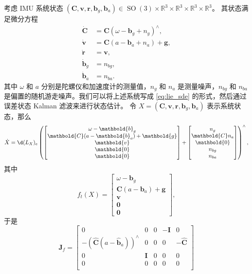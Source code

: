 \documentclass[fontset=none,zihao=-4]{Notes}
\DeclareMathOperator\SO{SO}
\newcommand{\mat}[1]{\mathbold{#1}}
\begin{document}
\begin{example}[IMU 系统]
  考虑 IMU 系统状态 $(\mat C,\mat v,\mat r,\mat b_g,\mat b_a)\in \SO(3)\times \mathbb{R}^3 \times \mathbb{R}^3 \times \mathbb{R}^3 \times \mathbb{R}^3$。
  其状态满足微分方程
  \begin{align*}
    \dot{\mat C}&=\mat C(\omega-\mat b_g+n_g)^\wedge,\\
    \dot{\mat v}&=\mat C(a-{\mat b}_a+n_a)+\mat g,\\
    \dot{\mat r}&=\mat v,\\
    \dot{\mat b}_g&=n_{bg},\\
    \dot{\mat b}_a&=n_{ba}.
  \end{align*}
  其中 $\omega$ 和 $a$ 分别是陀螺仪和加速度计的测量值，$n_g$ 和 $n_a$ 是测量噪声，$n_{bg}$ 和 $n_{ba}$ 是偏置的随机游走噪声。我们可以将上述系统写成 \eqref{eq:lie_sde} 的形式，然后通过误差状态 Kalman 滤波来进行状态估计。
  令 $X=(\mat C,\mat v,\mat r,\mat b_g,\mat b_a)$ 表示系统状态，那么
  \[
    \dot X=\d (L_X)_e\left(
      \begin{bmatrix}
        \omega-\mat b_g\\
        \mat C(a-{\mat b}_a)+\mat g\\
        \mat v\\
        \mat 0\\
        \mat 0
      \end{bmatrix}+
      \begin{bmatrix}
        n_g\\
        \mat C n_a\\
        \mat 0\\
        n_{bg}\\
        n_{ba}
      \end{bmatrix}
    \right)^\wedge,
  \] 
  其中
  \[
      f_t(X)=\begin{bmatrix}
        \omega-\mat b_g\\
        \mat C(a-{\mat b}_a)+\mat g\\
        \mat v\\
        \mat 0\\
        \mat 0
      \end{bmatrix},
  \]
  于是
  \[
      \mat J_f=\begin{bmatrix}
        0 & 0 & 0 & -\mat I & 0\\
        -(\hat{\mat C}(a-\hat{\mat b}_a))^\wedge & 0 & 0 & 0 & -\hat{\mat C}\\
        0 & \mat I & 0 & 0 & 0\\
        0 & 0 & 0 & 0 & 0\\

\end{bmatrix}\]
\end{example}
\end{document}
